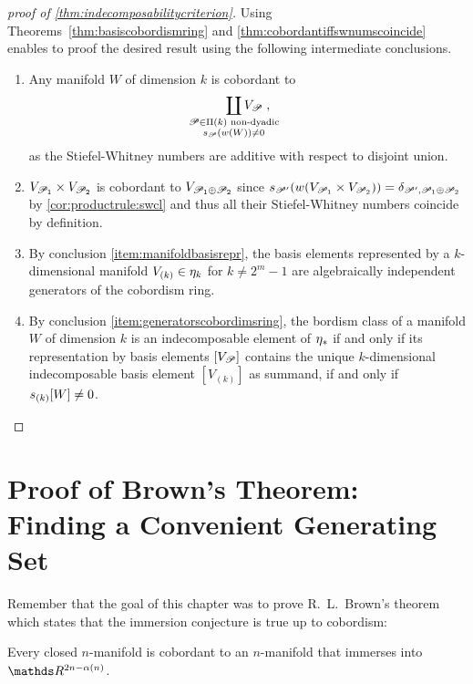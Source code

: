 \begin{proof}[proof of \autoref{thm:indecomposabilitycriterion}]
  Using Theorems~\autoref{thm:basiscobordismring} and
  \autoref{thm:cobordantiffswnumscoincide} enables to proof the
  desired result using the following intermediate conclusions.
  \begin{enumerate}
  \item Any manifold $W$ of dimension $k$ is
    cobordant to
    \begin{gather*}
      \coprod_{\mathclap{\substack{
            \Part\in\PartitionsOf k \text{ non-dyadic}\\
            \s{\Part}(\W{W})\neq 0
          }}} V_\Part
      \;,
    \end{gather*}
    as the Stiefel-Whitney numbers are additive with respect to
    disjoint union. %
  \item\label{item:manifoldbasisrepr}
    $V_{\mathscr{P}_1}\times V_{\mathscr{P}_2}$ is cobordant to
    $V_{\mathscr{P}_1\oplus\mathscr{P}_2}$ since
    $s_{\mathscr{P}'}({w}(V_{\mathscr{P}_1}\times V_{\mathscr{P}_2}))
    = \delta_{\mathscr{P}', \mathscr{P}_1\oplus\mathscr{P}_2}$
    by \ref{cor:productrule:swcl} and thus all their Stiefel-Whitney
    numbers coincide by definition.
  \item\label{item:generatorscobordimsring}
    By conclusion \ref{item:manifoldbasisrepr},
    the basis elements represented by a $k$-dimensional manifold
    $V_{(k)}\in\eta_k$ for $k\neq 2^m-1$ are algebraically independent
    generators of the cobordism ring.
  \item By conclusion \ref{item:generatorscobordimsring}, the bordism
    class of a manifold $W$ of dimension $k$ is an indecomposable
    element of $\eta_*$ if and only if its representation by basis
    elements $[V_{\mathscr{P}}]$ contains the unique $k$-dimensional
    indecomposable basis element $[V_{(k)}]$ as summand,
    \idest if and only if $s_{(k)}[W]\neq 0$.
    \qedhere
  \end{enumerate}
\end{proof}

\section
{Proof of Brown's Theorem: Finding a Convenient Generating Set}
Remember that the goal of this chapter was to prove R.~L.~Brown's
theorem which states that the immersion conjecture is true up to
cobordism:
\begin{Thm}[Brown]\label{thm:brown}
  Every closed $n$-manifold is cobordant to an $n$-manifold that immerses
  into $\R^{2n-\alpha(n)}$.
\end{Thm}

